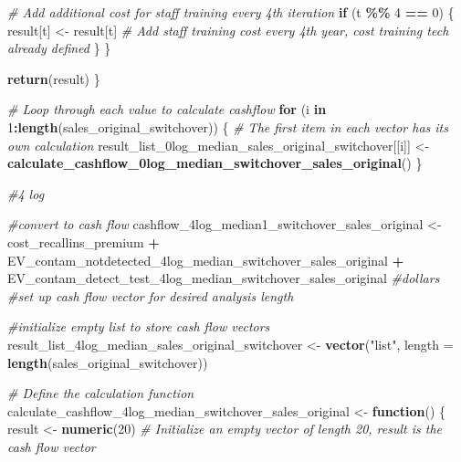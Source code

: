 \documentclass[
]{article}
\newenvironment{Shaded}{\begin{snugshade}}{\end{snugshade}}
\newcommand{\AttributeTok}[1]{\textcolor[rgb]{0.13,0.29,0.53}{#1}}
\newcommand{\CommentTok}[1]{\textcolor[rgb]{0.56,0.35,0.01}{\textit{#1}}}
\newcommand{\ControlFlowTok}[1]{\textcolor[rgb]{0.13,0.29,0.53}{\textbf{#1}}}
\newcommand{\DecValTok}[1]{\textcolor[rgb]{0.00,0.00,0.81}{#1}}
\newcommand{\FunctionTok}[1]{\textcolor[rgb]{0.13,0.29,0.53}{\textbf{#1}}}
\newcommand{\NormalTok}[1]{#1}
\newcommand{\OtherTok}[1]{\textcolor[rgb]{0.56,0.35,0.01}{#1}}
\newcommand{\SpecialCharTok}[1]{\textcolor[rgb]{0.81,0.36,0.00}{\textbf{#1}}}
\newcommand{\StringTok}[1]{\textcolor[rgb]{0.31,0.60,0.02}{#1}}
\begin{document}
\begin{Shaded}
\begin{Highlighting}[]
    \CommentTok{\# Add additional cost for staff training every 4th iteration}
    \ControlFlowTok{if}\NormalTok{ (t }\SpecialCharTok{\%\%} \DecValTok{4} \SpecialCharTok{==} \DecValTok{0}\NormalTok{) \{}
\NormalTok{      result[t] }\OtherTok{\textless{}{-}}\NormalTok{ result[t]  }\CommentTok{\# Add staff training cost every 4th year, cost training tech already defined}
\NormalTok{    \}}
\NormalTok{  \}}
  
  \FunctionTok{return}\NormalTok{(result)}
\NormalTok{\}}

\CommentTok{\# Loop through each value to calculate cashflow}
\ControlFlowTok{for}\NormalTok{ (i }\ControlFlowTok{in} \DecValTok{1}\SpecialCharTok{:}\FunctionTok{length}\NormalTok{(sales\_original\_switchover)) \{}
  \CommentTok{\# The first item in each vector has its own calculation}
\NormalTok{  result\_list\_0log\_median\_sales\_original\_switchover[[i]] }\OtherTok{\textless{}{-}} \FunctionTok{calculate\_cashflow\_0log\_median\_switchover\_sales\_original}\NormalTok{()}
\NormalTok{\}}


\CommentTok{\#4 log}

\CommentTok{\#convert to cash flow}
\NormalTok{cashflow\_4log\_median1\_switchover\_sales\_original }\OtherTok{\textless{}{-}}\NormalTok{ cost\_recallins\_premium }\SpecialCharTok{+}\NormalTok{ EV\_contam\_notdetected\_4log\_median\_switchover\_sales\_original }\SpecialCharTok{+}\NormalTok{ EV\_contam\_detect\_test\_4log\_median\_switchover\_sales\_original }\CommentTok{\#dollars}
\CommentTok{\#set up cash flow vector for desired analysis length}


\CommentTok{\#initialize empty list to store cash flow vectors}
\NormalTok{result\_list\_4log\_median\_sales\_original\_switchover }\OtherTok{\textless{}{-}} \FunctionTok{vector}\NormalTok{(}\StringTok{"list"}\NormalTok{, }\AttributeTok{length =} \FunctionTok{length}\NormalTok{(sales\_original\_switchover))}


\CommentTok{\# Define the calculation function}
\NormalTok{calculate\_cashflow\_4log\_median\_switchover\_sales\_original }\OtherTok{\textless{}{-}} \ControlFlowTok{function}\NormalTok{() \{}
\NormalTok{  result }\OtherTok{\textless{}{-}} \FunctionTok{numeric}\NormalTok{(}\DecValTok{20}\NormalTok{)  }\CommentTok{\# Initialize an empty vector of length 20, result is the cash flow vector}
  

\end{Highlighting}
\end{Shaded}
\end{document}
